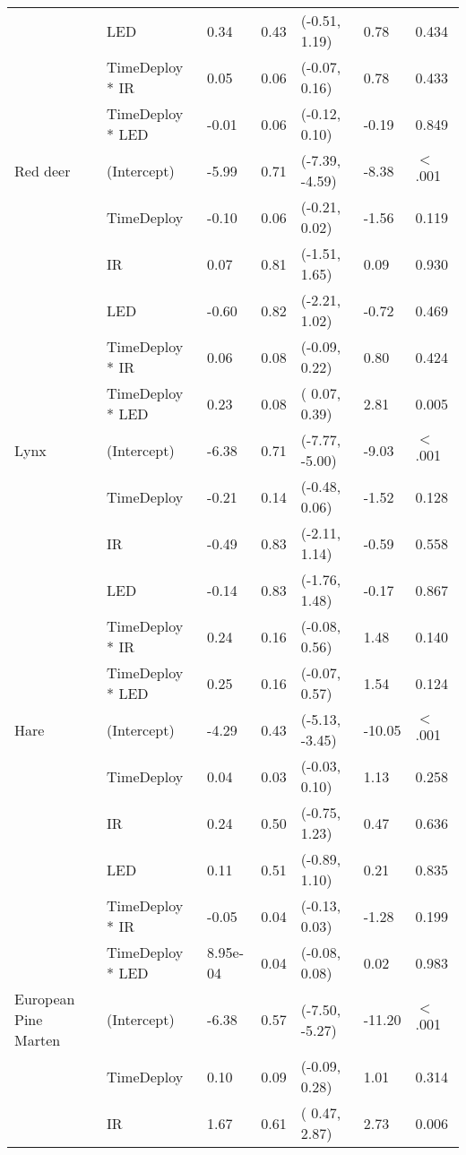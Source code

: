 \begin{table}[ht]
\begin{tabular}{lllllll}
   & LED & 0.34 & 0.43 & (-0.51,  1.19) & 0.78 & 0.434  \\ 
   & TimeDeploy * IR & 0.05 & 0.06 & (-0.07,  0.16) & 0.78 & 0.433  \\ 
   & TimeDeploy * LED & -0.01 & 0.06 & (-0.12,  0.10) & -0.19 & 0.849  \\ 
  Red deer & (Intercept) & -5.99 & 0.71 & (-7.39, -4.59) & -8.38 & $<$ .001 \\ 
   & TimeDeploy & -0.10 & 0.06 & (-0.21,  0.02) & -1.56 & 0.119  \\ 
   & IR & 0.07 & 0.81 & (-1.51,  1.65) & 0.09 & 0.930  \\ 
   & LED & -0.60 & 0.82 & (-2.21,  1.02) & -0.72 & 0.469  \\ 
   & TimeDeploy * IR & 0.06 & 0.08 & (-0.09,  0.22) & 0.80 & 0.424  \\ 
   & TimeDeploy * LED & 0.23 & 0.08 & ( 0.07,  0.39) & 2.81 & 0.005  \\ 
  Lynx & (Intercept) & -6.38 & 0.71 & (-7.77, -5.00) & -9.03 & $<$ .001 \\ 
   & TimeDeploy & -0.21 & 0.14 & (-0.48,  0.06) & -1.52 & 0.128  \\ 
   & IR & -0.49 & 0.83 & (-2.11,  1.14) & -0.59 & 0.558  \\ 
   & LED & -0.14 & 0.83 & (-1.76,  1.48) & -0.17 & 0.867  \\ 
   & TimeDeploy * IR & 0.24 & 0.16 & (-0.08,  0.56) & 1.48 & 0.140  \\ 
   & TimeDeploy * LED & 0.25 & 0.16 & (-0.07,  0.57) & 1.54 & 0.124  \\ 
  Hare & (Intercept) & -4.29 & 0.43 & (-5.13, -3.45) & -10.05 & $<$ .001 \\ 
   & TimeDeploy & 0.04 & 0.03 & (-0.03,  0.10) & 1.13 & 0.258  \\ 
   & IR & 0.24 & 0.50 & (-0.75,  1.23) & 0.47 & 0.636  \\ 
   & LED & 0.11 & 0.51 & (-0.89,  1.10) & 0.21 & 0.835  \\ 
   & TimeDeploy * IR & -0.05 & 0.04 & (-0.13,  0.03) & -1.28 & 0.199  \\ 
   & TimeDeploy * LED & 8.95e-04 & 0.04 & (-0.08,  0.08) & 0.02 & 0.983  \\ 
  European Pine Marten & (Intercept) & -6.38 & 0.57 & (-7.50, -5.27) & -11.20 & $<$ .001 \\ 
   & TimeDeploy & 0.10 & 0.09 & (-0.09,  0.28) & 1.01 & 0.314  \\ 
   & IR & 1.67 & 0.61 & ( 0.47,  2.87) & 2.73 & 0.006  \\ 

\end{tabular}
\end{table}
